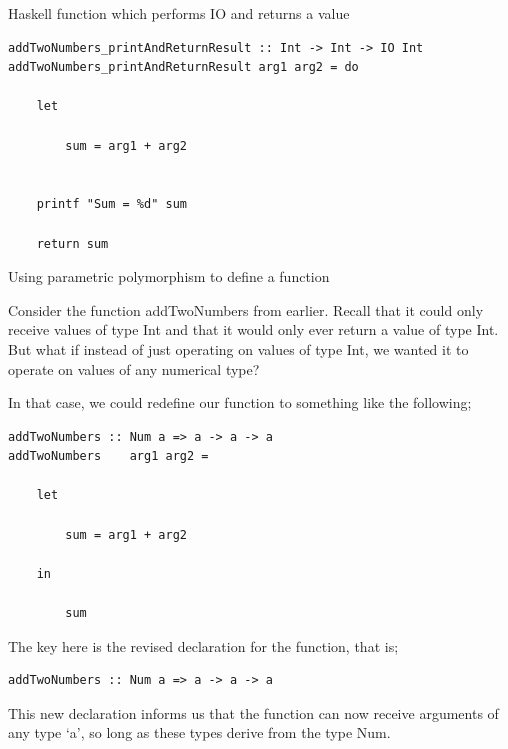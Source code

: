 
\begin{frame}[t, fragile]{Haskell function which performs IO and returns a value}

\begin{verbatim}
addTwoNumbers_printAndReturnResult :: Int -> Int -> IO Int
addTwoNumbers_printAndReturnResult arg1 arg2 = do

    let

        sum = arg1 + arg2


    printf "Sum = %d" sum

    return sum
\end{verbatim}

\end{frame}



\begin{frame}[t, fragile]{Using parametric polymorphism to define a function}

Consider the function addTwoNumbers from earlier. Recall that it could only receive values of type Int and that it
would only ever return a value of type Int. But what if instead of just operating on values of type Int, we wanted it to
operate on values of any numerical type?

In that case, we could redefine our function to something like the following;

\begin{verbatim}
addTwoNumbers :: Num a => a -> a -> a
addTwoNumbers    arg1 arg2 =

    let

        sum = arg1 + arg2

    in

        sum
\end{verbatim}

The key here is the revised declaration for the function, that is;

\begin{verbatim}
addTwoNumbers :: Num a => a -> a -> a
\end{verbatim}

This new declaration informs us that the function can now receive arguments of any type `a', so long as these types
derive from the type Num.

\end{frame}



